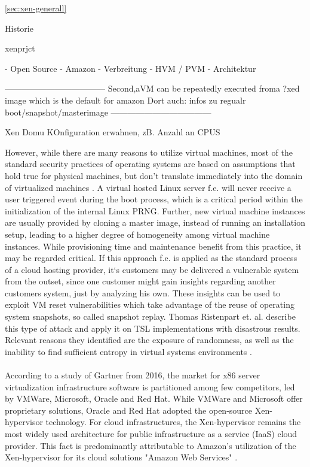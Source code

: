 \ref{sec:xen-generall}



Historie

xenprjct

- Open Source
- Amazon
- Verbreitung 
- HVM / PVM
- Architektur

------------------------------------
\cite{everspaugh2014not}
Second,aVM  can be repeatedly executed froma ?xed image which is the default for amazon
Dort auch: infos zu regualr boot/snapshot/masterimage
------------------------------------

Xen Domu KOnfiguration erwahnen, zB. Anzahl an CPUS

However, while there are many reasons to utilize virtual machines, most of the standard security practices of operating systems are based on assumptions that hold true for physical machines, but don't translate immediately into the domain of virtualized machines \cite{kerrigan2012study}. A virtual hosted Linux server f.e. will never receive a user triggered event during the boot process, which is a critical period within the initialization of the internal Linux PRNG. Further, new virtual machine instances are usually provided by cloning a master image, instead of running an installation setup, leading to a higher degree of homogeneity among virtual machine instances. While provisioning time and maintenance benefit from this practice, it may be regarded critical. If this approach f.e. is applied as the standard process of a cloud hosting provider, it`s customers may be delivered a vulnerable system from the outset, since one customer might gain insights regarding another customers system, just by analyzing his own. These insights can be used to exploit VM reset vulnerabilities which take advantage of the reuse of  operating system snapshots, so called snapshot replay. Thomas Ristenpart et. al. describe this type of attack and apply it on TSL implementations with disastrous results. Relevant reasons they identified are the exposure of randomness, as well as the inability to find sufficient entropy in virtual systems environments \cite{ristenpart2010good, ristenpart2009hey}. \\~\\
According to a study of Gartner from 2016, the market for x86 server virtualization infrastructure software is partitioned among few competitors, led by VMWare, Microsoft, Oracle and Red Hat. While VMWare and Microsoft offer proprietary solutions, Oracle and Red Hat adopted the open-source Xen-hypervisor technology. For cloud infrastructures, the Xen-hypervisor remains the most widely used architecture for public infrastructure as a service (IaaS) cloud provider. This fact is predominantly attributable to Amazon's utilization of the Xen-hypervisor for its cloud solutions "Amazon Web Services" \cite{bittman2016magic}. 

